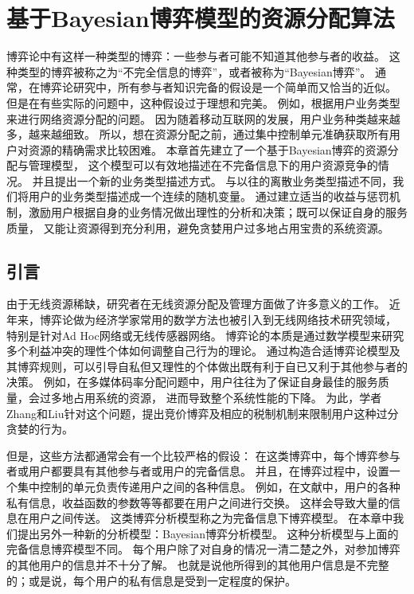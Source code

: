 \graphicspath{{../body/bayesian_figures/}}
\chapter{基于Bayesian博弈模型的资源分配算法}
\par 博弈论中有这样一种类型的博弈：一些参与者可能不知道其他参与者的收益。
这种类型的博弈被称之为“不完全信息的博弈”，或者被称为“Bayesian博弈”。
通常，在博弈论研究中，所有参与者知识完备的假设是一个简单而又恰当的近似。
但是在有些实际的问题中，这种假设过于理想和完美。
例如，根据用户业务类型来进行网络资源分配的问题。
因为随着移动互联网的发展，用户业务种类越来越多，越来越细致。
所以，想在资源分配之前，通过集中控制单元准确获取所有用户对资源的精确需求比较困难。
本章首先建立了一个基于Bayesian博弈的资源分配与管理模型，
这个模型可以有效地描述在不完备信息下的用户资源竞争的情况。
并且提出一个新的业务类型描述方式。
与以往的离散业务类型描述不同，我们将用户的业务类型描述成一个连续的随机变量。
通过建立适当的收益与惩罚机制，激励用户根据自身的业务情况做出理性的分析和决策；既可以保证自身的服务质量，
又能让资源得到充分利用，避免贪婪用户过多地占用宝贵的系统资源。
%
\section{引言}
由于无线资源稀缺，研究者在无线资源分配及管理方面做了许多意义的工作。
近年来，博弈论做为经济学家常用的数学方法也被引入到无线网络技术研究领域，
特别是针对Ad Hoc网络或无线传感器网络\cite{Srivastava:2005}\cite{FangBensaou2004}。
博弈论的本质是通过数学模型来研究多个利益冲突的理性个体如何调整自己行为的理论。
通过构造合适博弈论模型及其博弈规则，可以引导自私但又理性的个体做出既有利于自已又利于其他参与者的决策。
例如，在多媒体码率分配问题中，用户往往为了保证自身最佳的服务质量，会过多地占用系统的资源，
进而导致整个系统性能的下降。
为此，学者Zhang和Liu针对这个问题，提出竞价博弈及相应的税制机制来限制用户这种过分贪婪的行为\cite{ZhangLiu2011}。

但是，这些方法都通常会有一个比较严格的假设：
在这类博弈中，每个博弈参与者或用户都要具有其他参与者或用户的完备信息。
并且，在博弈过程中，设置一个集中控制的单元负责传递用户之间的各种信息。
例如，在文献\cite{ZhangLiu2011}中，用户的各种私有信息，收益函数的参数等等都要在用户之间进行交换。
这样会导致大量的信息在用户之间传送。
这类博弈分析模型称之为完备信息下博弈模型。
在本章中我们提出另外一种新的分析模型：Bayesian博弈分析模型。
这种分析模型与上面的完备信息博弈模型不同。
每个用户除了对自身的情况一清二楚之外，对参加博弈的其他用户的信息并不十分了解。
也就是说他所得到的其他用户信息是不完整的；或是说，每个用户的私有信息是受到一定程度的保护。
